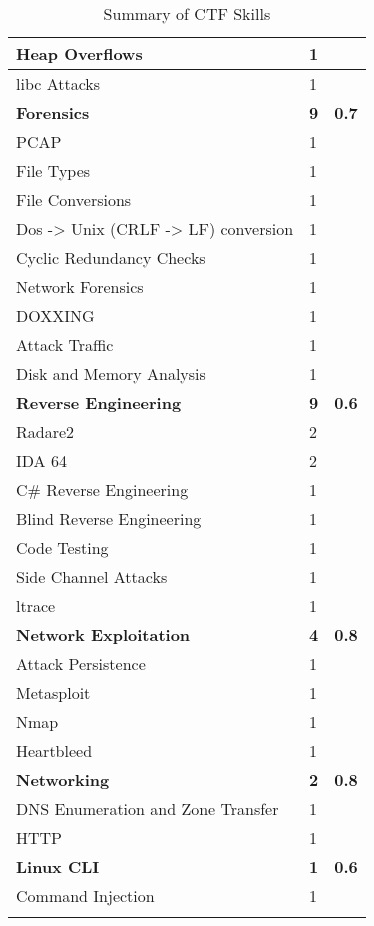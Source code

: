 \documentclass[a4paper,11pt]{report}
\begin{document}
\begin{center}
\begin{longtable}{| l | l | l |}
					\quad Heap Overflows & 1 & \\ \hline 
					\quad libc Attacks & 1 & \\ \hline 
					\textbf{Forensics} & \textbf{9} & \textbf{0.7}\\ \hline
					\quad PCAP & 1 & \\ \hline
					\quad File Types & 1 & \\ \hline
					\quad File Conversions & 1 & \\ \hline 
					\quad Dos -> Unix (CRLF -> LF) conversion & 1 & \\ \hline 
					\quad Cyclic Redundancy Checks & 1 & \\ \hline
					\quad Network Forensics & 1 & \\ \hline 
					\quad DOXXING & 1 & \\ \hline 
					\quad Attack Traffic & 1 & \\ \hline 
					\quad Disk and Memory Analysis & 1 & \\ \hline 
					\textbf{Reverse Engineering} & \textbf{9} & \textbf{0.6}\\ \hline 
					\quad Radare2 & 2 & \\ \hline 
					\quad IDA 64 & 2 & \\ \hline 
					\quad C\# Reverse Engineering & 1 & \\ \hline
					\quad Blind Reverse Engineering & 1 & \\ \hline 
					\quad Code Testing & 1 & \\ \hline 
					\quad Side Channel Attacks & 1 & \\ \hline 
					\quad ltrace & 1 & \\ \hline 
					\textbf{Network Exploitation} & \textbf{4} & \textbf{0.8} \\ \hline 
					\quad Attack Persistence & 1 & \\ \hline 
					\quad Metasploit & 1 & \\ \hline 
					\quad Nmap & 1 & \\ \hline 
					\quad Heartbleed & 1 & \\ \hline
					\textbf{Networking} & \textbf{2} & \textbf{0.8}\\ \hline
					\quad DNS Enumeration and Zone Transfer & 1 & \\ \hline 
					\quad HTTP & 1 & \\ \hline 
					\textbf{Linux CLI} & \textbf{1} &\textbf{0.6} \\ \hline
					\quad Command Injection & 1 & \\ \hline 
					\caption{\label{tab:summary}Summary of CTF Skills}
				\end{longtable}
			\end{center}
\appendix
	\label{ch:Appendix}
	\listoftables
\end{document}
